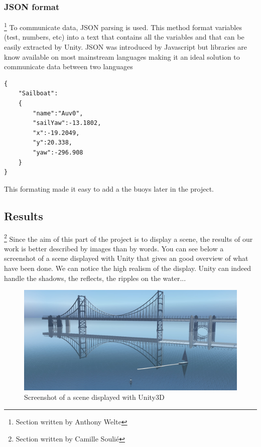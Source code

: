 \documentclass[a4paper]{report}
\begin{document}
\subsubsection{JSON format}
\footnote{Section written by Anthony Welte}
To communicate data, JSON parsing is used. This method format variables (test, numbers, etc) into a text that contains all the variables and that can be easily extracted by Unity. JSON was introduced by Javascript but libraries are know available on most mainstream languages making it an ideal solution to communicate data between two languages

\renewcommand{\lstlistingname}{Code}
\begin{lstlisting}[caption=JSON format, frame=single]
{
    "Sailboat":
    {
        "name":"Auv0",
        "sailYaw":-13.1802,
        "x":-19.2049,
        "y":20.338,
        "yaw":-296.908
    }
}
\end{lstlisting}

This formating made it easy to add a the buoys later in the project. %

\subsection{Results}
\footnote{Section written by Camille Soulié}
Since the aim of this part of the project is to display a scene, the results of our work is better described by images than by words. You can see below a screenshot of a scene displayed with Unity that gives an good overview of what have been done. We can notice the high realism of the display. Unity can indeed handle the shadows, the reflects, the ripples on the water...

\begin{figure}[H]
	\centering
    \caption{Screenshot of a scene displayed with Unity3D}
    \includegraphics[scale=0.5]{image/DisplayUnityResult.jpg}
	\end{figure}
\end{document}

